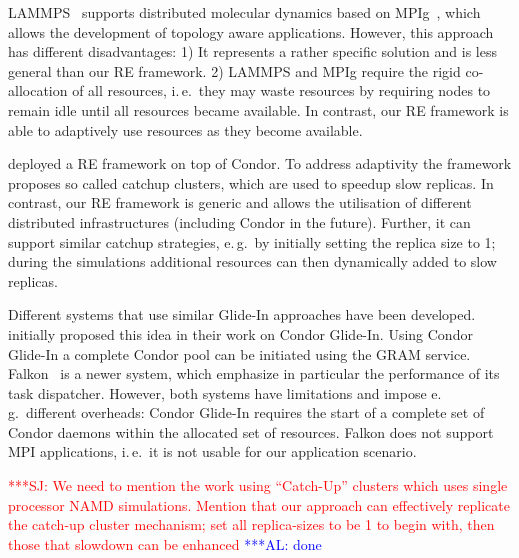 \documentclass{rspublic}
\newcommand{\alnote}[1]{ {\textcolor{blue} { ***AL: #1 }}}
\newcommand{\jhanote}[1]{ {\textcolor{red} { ***SJ: #1 }}}
\newcommand{\alnote}[1]{}
\newcommand{\jhanote}[1]{}
\newcommand{\glidein}[1]{Glide-In }
\begin{document}
LAMMPS~\citep{Plimpton:1995nx,repex_mpig} supports distributed molecular
dynamics based on MPIg~\citep{Toonen:2008ao}, which allows the
development of topology aware applications. However, this approach has
different disadvantages: 1) It represents a rather specific solution
and is less general than our RE framework. 2) LAMMPS and MPIg require
the rigid co-allocation of all resources, i.\,e.\ they may waste resources
by requiring nodes to remain idle until all resources became
available.  In contrast, our RE framework is able to adaptively use
resources as they become available.    

\cite{Woods:2005nx} deployed a RE framework on top of Condor. 
To address adaptivity the framework proposes so called catchup clusters,
which are used to speedup slow replicas. In contrast, our RE 
framework is generic and allows the utilisation of different distributed 
infrastructures (including Condor in the future). Further, it can support 
similar catchup strategies, e.\,g.\ by initially setting
the replica size  to 1; during the simulations additional resources 
can then dynamically added to slow replicas.

Different systems that use similar Glide-In approaches have been
developed. \citet{citeulike:291860} initially proposed this idea in
their work on Condor Glide-In. Using Condor Glide-In a complete Condor
pool can be initiated using the GRAM service. Falkon~\citep{1362680}
is a newer system, which emphasize in particular the performance of
its task dispatcher.  However, both systems have limitations and
impose e.\,g.\ different overheads: Condor \glidein\ requires the
start of a complete set of Condor daemons within the allocated set of
resources. 
Falkon  does not support MPI applications, i.\,e.\ it is not usable for our
application scenario.  

\jhanote{We need to mention the work using ``Catch-Up'' clusters which
  uses single processor NAMD simulations. Mention that our approach
  can effectively replicate the catch-up cluster mechanism; set all
  replica-sizes to be 1 to begin with, then those that slowdown can
  be enhanced}
\alnote{done}

\end{document}
